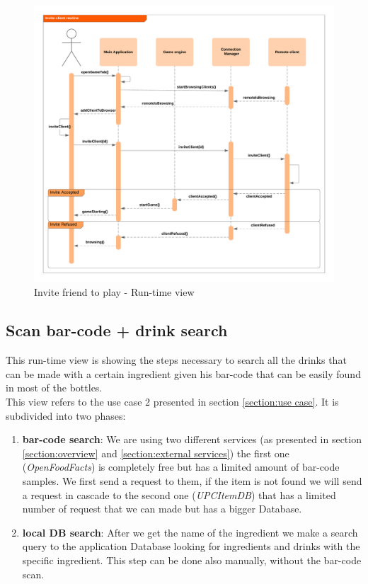 \documentclass[paper=a4, fontsize=12pt]{scrartcl}
\numberwithin{equation}{section}		%
\numberwithin{figure}{section}			%
\numberwithin{table}{section}				%
\begin{document}
\begin{figure}[H]
\begin{center}
    \includegraphics[width=\textwidth]{RunTime/InviteFriend.png}
    \caption{Invite friend to play - Run-time view}
    \label{Invite friend rt}
\end{center}
\end{figure}

\newpage
\subsection{Scan bar-code + drink search}
This run-time view is showing the steps necessary to search all the drinks that can be made with a certain ingredient given his bar-code that can be easily found in most of the bottles.\\
This view refers to the use case 2 presented in section \ref{section:use case}. It is subdivided into two phases:

\begin{enumerate}
    \item \textbf{bar-code search}: We are using two different services (as presented in section \ref{section:overview} and \ref{section:external services}) the first one (\textit{OpenFoodFacts}) is completely free but has a limited amount of bar-code samples. We first send a request to them, if the item is not found we will send a request in cascade to the second one (\textit{UPCItemDB}) that has a limited number of request that we can made but has a bigger Database.
    \item \textbf{local DB search}: After we get the name of the ingredient we make a search query to the application Database looking for ingredients and drinks with the specific ingredient. This step can be done also manually, without the bar-code scan.
\end{enumerate}
\end{document}
